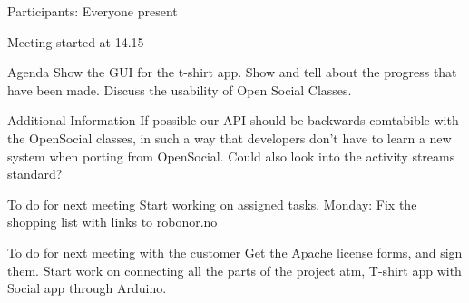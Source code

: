 Participants: Everyone present

Meeting started at 14.15

Agenda
Show the GUI for the t-shirt app.
Show and tell about the progress that have been made.
Discuss the usability of Open Social Classes.

Additional Information
If possible our API should be backwards comtabible with the OpenSocial classes, in such a way that developers don’t have to learn a new system when porting from OpenSocial.
Could also look into the activity streams standard?

To do for next meeting
Start working on assigned tasks.
Monday: Fix the shopping list with links to robonor.no

To do for next meeting with the customer
Get the Apache license forms, and sign them.
Start work on connecting all the parts of the project atm, T-shirt app with Social app through Arduino.
